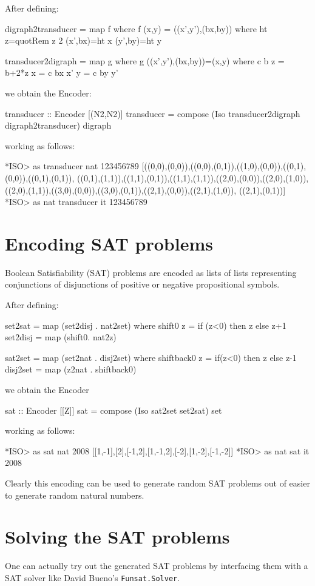 \documentclass[]{INCLUDES/llncs}
\begin{document}
After defining:
\begin{code}
digraph2transducer = map f where
  f (x,y) = ((x',y'),(bx,by)) where
     ht z=quotRem z 2
     (x',bx)=ht x
     (y',by)=ht y
       
transducer2digraph = map g where
  g ((x',y'),(bx,by))=(x,y) where
    c b z = b+2*z
    x = c bx x'
    y = c by y'
\end{code}

we obtain the Encoder:
\begin{code}
transducer :: Encoder [(N2,N2)]
transducer = compose (Iso transducer2digraph digraph2transducer) digraph
\end{code}
working as follows:
\begin{codex}
*ISO> as transducer nat 123456789
[((0,0),(0,0)),((0,0),(0,1)),((1,0),(0,0)),((0,1),(0,0)),((0,1),(0,1)),
 ((0,1),(1,1)),((1,1),(0,1)),((1,1),(1,1)),((2,0),(0,0)),((2,0),(1,0)),
 ((2,0),(1,1)),((3,0),(0,0)),((3,0),(0,1)),((2,1),(0,0)),((2,1),(1,0)),
 ((2,1),(0,1))] 
*ISO> as nat transducer it
123456789
\end{codex}

\section{Encoding SAT problems}
Boolean Satisfiability (SAT) problems are encoded as lists of lists representing
conjunctions of disjunctions of positive or negative propositional symbols.

After defining:
\begin{code}
set2sat = map (set2disj . nat2set) where
  shift0 z = if (z<0) then z else z+1
  set2disj = map (shift0. nat2z)
  
sat2set = map (set2nat . disj2set) where
  shiftback0 z = if(z<0) then z else z-1
  disj2set = map (z2nat . shiftback0)
\end{code}
we obtain the Encoder
\begin{code}
sat :: Encoder [[Z]]
sat = compose (Iso sat2set set2sat) set
\end{code}
working as follows:
\begin{codex}
*ISO> as sat nat 2008
[[1,-1],[2],[-1,2],[1,-1,2],[-2],[1,-2],[-1,-2]]
*ISO> as nat sat it
2008
\end{codex}
Clearly this encoding can be used to generate random SAT problems out of
easier to generate random natural numbers.

\section{Solving the SAT problems}
One can actually try out the generated SAT problems by interfacing them
with a SAT solver like David Bueno's {\tt Funsat.Solver}.
\end{document}
